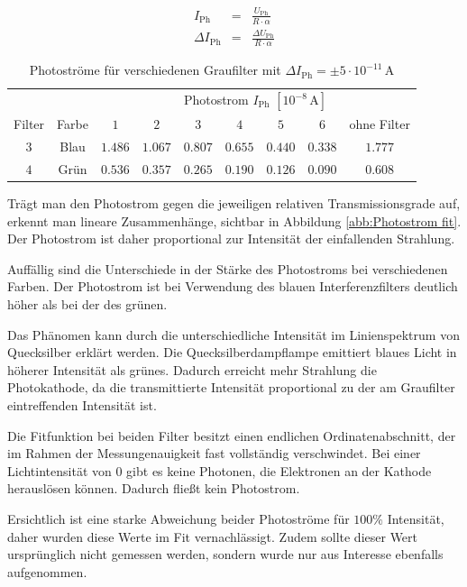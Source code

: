 \documentclass[12pt,a4paper]{scrartcl}
\numberwithin{equation}{section} %
\begin{document}
\begin{eqnarray}
	I_\mathrm{Ph} &=& \frac{U_\mathrm{Ph}}{R \cdot \alpha} \\
	\Delta I_\mathrm{Ph} &=& \frac{\Delta U_\mathrm{Ph}}{R \cdot \alpha}
\end{eqnarray}

\begin{table}[h!]
	\centering
	\begin{tabular}{c|c|c|c|c|c|c|c|c}
		&& \multicolumn{7}{c}{Photostrom $I_\mathrm{Ph}$ $[10^{-8}\mathrm{\,A}]$} \\
		Filter & Farbe & $1$ & $2$ & $3$ & $4$ & $5$ & $6$ & ohne Filter\\
		\hline
		$3$ & Blau & $1.486$ & $1.067$ & $0.807$ & $0.655$ & $0.440$ & $0.338$ & $1.777$ \\
		$4$ & Grün & $0.536$ & $0.357$ & $0.265$ & $0.190$ & $0.126$ & $0.090$ & $0.608$
	\end{tabular}
	\caption{Photoströme für verschiedenen Graufilter mit $\Delta I_\mathrm{Ph} = \pm 5 \cdot 10^{-11} \mathrm{\,A}$}
	\label{tab:Photostrom Ergebnisse}
\end{table}

\noindent
Trägt man den Photostrom gegen die jeweiligen relativen Transmissionsgrade auf, erkennt man lineare Zusammenhänge, sichtbar in Abbildung \ref{abb:Photostrom fit}. Der Photostrom ist daher proportional zur Intensität der einfallenden Strahlung.

Auffällig sind die Unterschiede in der Stärke des Photostroms bei verschiedenen Farben. Der Photostrom ist bei Verwendung des blauen Interferenzfilters deutlich höher als bei der des grünen.

Das Phänomen kann durch die unterschiedliche Intensität im Linienspektrum von Quecksilber erklärt werden. Die Quecksilberdampflampe emittiert blaues Licht in höherer Intensität als grünes. Dadurch erreicht mehr Strahlung die Photokathode, da die transmittierte Intensität proportional zu der am Graufilter eintreffenden Intensität ist.

Die Fitfunktion bei beiden Filter besitzt einen endlichen Ordinatenabschnitt, der im Rahmen der Messungenauigkeit fast vollständig verschwindet. Bei einer Lichtintensität von $0$ gibt es keine Photonen, die Elektronen an der Kathode herauslösen können. Dadurch fließt kein Photostrom.

Ersichtlich ist eine starke Abweichung beider Photoströme für $100 \%$ Intensität, daher wurden diese Werte im Fit vernachlässigt. Zudem sollte dieser Wert ursprünglich nicht gemessen werden, sondern wurde nur aus Interesse ebenfalls aufgenommen.
\end{document}
